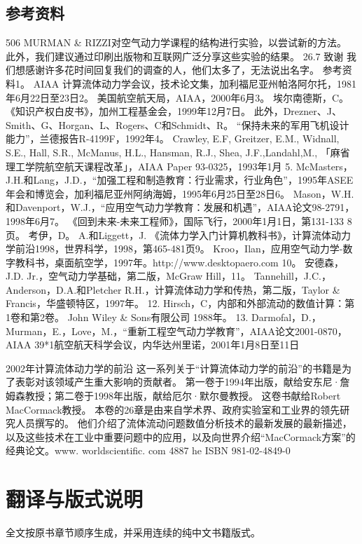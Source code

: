 \documentclass[UTF8,11pt,a4paper,openany,fontset=fandol]{ctexbook}
\begin{document}
\section{参考资料}
506 MURMAN \& RIZZI对空气动力学课程的结构进行实验，以尝试新的方法。 此外，我们建议通过印刷出版物和互联网广泛分享这些实验的结果。 26.7 致谢 我们想感谢许多花时间回复我们的调查的人，他们太多了，无法说出名字。 参考资料1。 AIAA 计算流体动力学会议，技术论文集，加利福尼亚州帕洛阿尔托，1981年6月22日至23日2。 美国航空航天局，AIAA，2000年6月3。 埃尔南德斯，C。 《知识产权白皮书》，加州工程基金会，1999年12月7日。 此外，Drezner、J、Smith、G、Horgan、L、Rogers、C和Schmidt、R。 “保持未来的军用飞机设计能力”，兰德报告R-4199F，1992年4。 Crawley, E.F, Greitzer, E.M., Widnall, S.E., Hall, S.R., McManus, H.L., Hansman, R.J., Shea, J.F.,Landahl,M., 「麻省理工学院航空航天课程改革」，AIAA Paper 93-0325，1993年1月 5. McMasters，J.H.和Lang，J.D.，“加强工程和制造教育：行业需求，行业角色”，1995年ASEE年会和博览会，加利福尼亚州阿纳海姆，1995年6月25日至28日6。 Mason，W.H.和Davenport，W.J.，“应用空气动力学教育：发展和机遇”，AIAA论文98-2791，1998年6月7。 《回到未来-未来工程师》，国际飞行，2000年1月1日，第131-133 8页。 考伊，D。 A.和Liggett，J. 《流体力学入门计算机教科书》，计算流体动力学前沿1998，世界科学，1998，第465-481页9。 Kroo，Ilan，应用空气动力学-数字教科书，桌面航空学，1997年。http://www.desktopaero.com 10。 安德森，J.D. Jr.，空气动力学基础，第二版，McGraw Hill，11。 Tannehill，J.C.，Anderson，D.A.和Pletcher R.H.，计算流体动力学和传热，第二版，Taylor \& Francis，华盛顿特区，1997年。 12. Hirsch，C，内部和外部流动的数值计算：第1卷和第2卷。 John Wiley \& Sons有限公司 1988年。 13. Darmofal，D.，Murman，E.，Love，M.，“重新工程空气动力学教育”，AIAA论文2001-0870，AIAA 39*1航空航天科学会议，内华达州里诺，2001年1月8日至11日

2002年计算流体动力学的前沿 这一系列关于“计算流体动力学的前沿”的书籍是为了表彰对该领域产生重大影响的贡献者。 第一卷于1994年出版，献给安东尼·詹姆森教授；第二卷于1998年出版，献给厄尔·默尔曼教授。 这卷书献给Robert MacCormack教授。 本卷的26章是由来自学术界、政府实验室和工业界的领先研究人员撰写的。 他们介绍了流体流动问题数值分析技术的最新发展的最新描述，以及这些技术在工业中重要问题中的应用，以及向世界介绍“MacCormack方案”的经典论文。www. worldscientific. com 4887 he ISBN 981-02-4849-0

\backmatter
\chapter*{翻译与版式说明}
全文按原书章节顺序生成，并采用连续的纯中文书籍版式。
\end{document}
